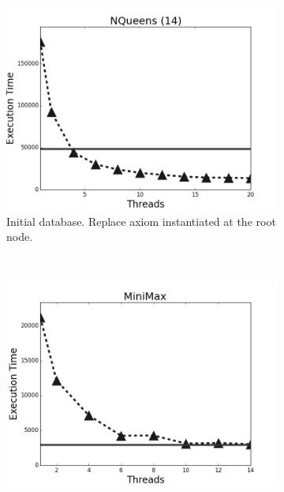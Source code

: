 \begin{figure}[h]
        \centering
        \begin{subfigure}[b]{0.5\textwidth}
                \includegraphics[width=\textwidth]{experiments/scalability/scale-8queens-14.png}
                \caption{Initial database. Replace axiom instantiated at the
                    root node.}
                   \label{fig:implementation:scale_queens}
        \end{subfigure}%
        ~
        \begin{subfigure}[b]{0.5\textwidth}
                \includegraphics[width=\textwidth]{experiments/scalability/scale-min-max-tictactoe.png}


\end{subfigure}
\end{figure}
